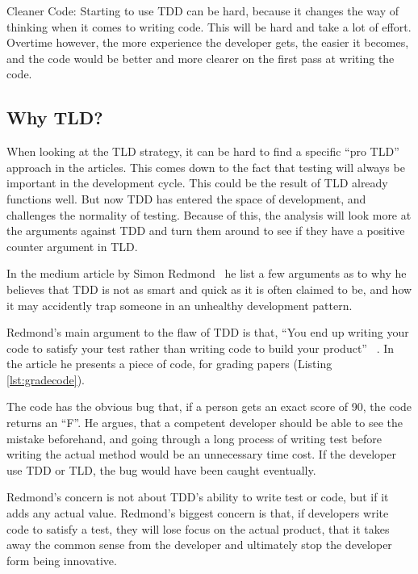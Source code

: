 Cleaner Code:
Starting to use TDD can be hard, because it changes the way of thinking when it comes to writing code. This will be hard and take a lot of effort. Overtime however, the more experience the developer gets, the easier it becomes, and the code would be better and more clearer on the first pass at writing the code.



\subsection{Why TLD?}
When looking at the TLD strategy, it can be hard to find a specific “pro TLD” approach in the articles. This comes down to the fact that testing will always be important in the development cycle. This could be the result of TLD already functions well. But now TDD has entered the space of development, and challenges the normality of testing. Because of this, the analysis will look more at the arguments against TDD and turn them around to see if they have a positive counter argument in TLD. 
 
In the medium article by Simon Redmond~\cite{sr2019} he list a few arguments as to why he believes that TDD is not as smart and quick as it is often claimed to be, and how it may accidently trap someone in an unhealthy development pattern. 
 
Redmond’s main argument to the flaw of TDD is that,  “You end up writing your code to satisfy your test rather than writing code to build your product” ~\cite{sr2019}. In the article he presents a piece of code, for grading papers (Listing \ref{lst:gradecode}). 
\newline


The code has the obvious bug that, if a person gets an exact score of 90, the code returns an “F”. He argues, that a competent developer should be able to see the mistake beforehand, and going through a long process of writing test before writing the actual method would be an unnecessary time cost. If the developer use TDD or TLD, the bug would have been caught eventually.
 
Redmond’s concern is not about TDD’s ability to write test or code, but if it adds any actual value. Redmond’s biggest concern is that, if developers write code to satisfy a test, they will lose focus on the actual product, that it takes away the common sense from the developer and ultimately stop the developer form being innovative.\newline  


